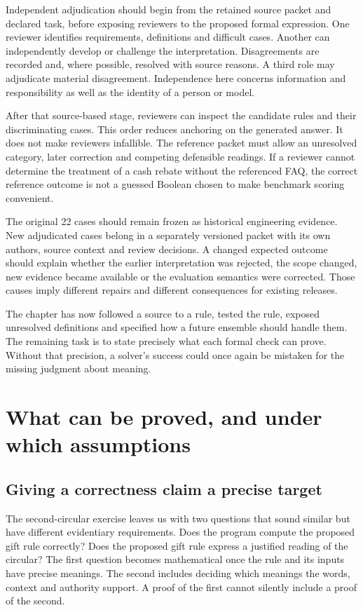 \documentclass[12pt,a4paper,oneside,openany]{book}
\begin{document}
Independent adjudication should begin from the retained source packet and
declared task, before exposing reviewers to the proposed formal expression.
One reviewer identifies requirements, definitions and difficult cases. Another
can independently develop or challenge the interpretation. Disagreements are
recorded and, where possible, resolved with source reasons. A third role may
adjudicate material disagreement. Independence here concerns information and
responsibility as well as the identity of a person or model.

After that source-based stage, reviewers can inspect the candidate rules and
their discriminating cases. This order reduces anchoring on the generated
answer. It does not make reviewers infallible. The reference packet must allow
an unresolved category, later correction and competing defensible readings.
If a reviewer cannot determine the treatment of a cash rebate without the
referenced FAQ, the correct reference outcome is not a guessed Boolean chosen
to make benchmark scoring convenient.

The original 22 cases should remain frozen as historical engineering evidence.
New adjudicated cases belong in a separately versioned packet with its own
authors, source context and review decisions. A changed expected outcome should
explain whether the earlier interpretation was rejected, the scope changed,
new evidence became available or the evaluation semantics were corrected.
Those causes imply different repairs and different consequences for existing
releases.

The chapter has now followed a source to a rule, tested the rule, exposed
unresolved definitions and specified how a future ensemble should handle them.
The remaining task is to state precisely what each formal check can prove.
Without that precision, a solver's success could once again be mistaken for
the missing judgment about meaning.

\chapter{What can be proved, and under which assumptions}
\label{ch:proof}

\section{Giving a correctness claim a precise target}
\label{sec:proof-target}
The second-circular exercise leaves us with two questions that sound similar but
have different evidentiary requirements. Does the program compute the proposed
gift rule correctly? Does the proposed gift rule express a justified reading of
the circular? The first question becomes mathematical once the rule and its
inputs have precise meanings. The second includes deciding which meanings the
words, context and authority support. A proof of the first cannot silently
include a proof of the second.
\end{document}
